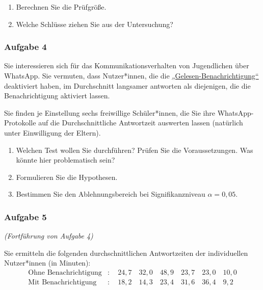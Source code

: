 \documentclass[
  ngerman,
]{article}
\providecommand{\tightlist}{%
  \setlength{\itemsep}{0pt}\setlength{\parskip}{0pt}}
\begin{document}
\begin{enumerate}
\def\labelenumi{\alph{enumi})}
\tightlist
\item
  Berechnen Sie die Prüfgröße.
\item
  Welche Schlüsse ziehen Sie aus der Untersuchung?
\end{enumerate}

\hypertarget{aufgabe-4-2}{%
\subsubsection{Aufgabe 4}\label{aufgabe-4-2}}

Sie interessieren sich für das Kommunikationsverhalten von Jugendlichen über WhatsApp. Sie vermuten, dass Nutzer*innen, die die \href{https://faq.whatsapp.com/en/android/28000015/?lang=de}{„Gelesen-Benachrichtigung``} deaktiviert haben, im Durchschnitt langsamer antworten als diejenigen, die die Benachrichtigung aktiviert lassen.

Sie finden je Einstellung sechs freiwillige Schüler*innen, die Sie ihre WhatsApp-Protokolle auf die Durchschnittliche Antwortzeit auswerten lassen (natürlich unter Einwilligung der Eltern).

\begin{enumerate}
\def\labelenumi{\alph{enumi})}
\tightlist
\item
  Welchen Test wollen Sie durchführen? Prüfen Sie die Voraussetzungen. Was könnte hier problematisch sein?
\item
  Formulieren Sie die Hypothesen.
\item
  Bestimmen Sie den Ablehnungsbereich bei Signifikanzniveau \(\alpha=0{,}05\).
\end{enumerate}

\hypertarget{aufgabe-5-1}{%
\subsubsection{Aufgabe 5}\label{aufgabe-5-1}}

\emph{(Fortführung von Aufgabe 4)}

Sie ermitteln die folgenden durchschnittlichen Antwortzeiten der individuellen Nutzer*innen (in Minuten):
\[\begin{aligned}
\textrm{Ohne Benachrichtigung} &: \quad 24,7\quad32,0\quad48,9\quad23,7\quad23,0\quad10,0\\
\textrm{Mit Benachrichtigung} &: \quad18,2\quad14,3\quad23,4\quad31,6\quad36,4\quad 9,2
\end{aligned}\]
\end{document}
